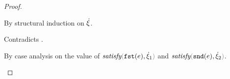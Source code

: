 \begin{proof}
\begin{byCases}
  \begin{pfsteps}
  \item {}  
  \end{pfsteps}  
  By structural induction on $\dot{\xi}$.
  \begin{byCases}
    \item[\hxi=\ctruth]
    \begin{pfsteps}
    \item {} 
    \end{pfsteps} 
    Contradicts .
    \item[\hxi=\cunknown]
    \begin{pfsteps}
    \item {} 
    \end{pfsteps} 
    \item[\hxi=\cnum{n}] 
    \begin{pfsteps}
    \item {} 
    \end{pfsteps} 
    \item[\hxi=\cinl{\hxi_1}]
    \begin{pfsteps}
    \item {} 
    \end{pfsteps} 
    \item[\hxi=\cinr{\hxi_2}]
    \begin{pfsteps}
    \item {} 
    \end{pfsteps} 
    \item[\hxi=\cpair{\hxi_1}{\hxi_2}]   
    \begin{pfsteps}
    \item {}  
    \item {}  
    \end{pfsteps}
    By case analysis on the value of $\fsatisfy{\hfst{e}}{\hxi_1}$ and $\fsatisfy{\hsnd{e}}{\hxi_2}$.
    \begin{byCases}
      \item[\true, \true]

\end{byCases}
\end{byCases}
\end{byCases}
\end{proof}
